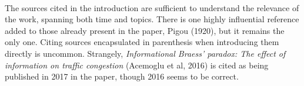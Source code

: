 \documentclass[../review.tex]{subfiles}
\begin{document}
\\
The sources cited in the introduction are sufficient to understand the relevance of the work, spanning both time and topics. There is one highly influential reference added to those already present in the paper, Pigou (1920), but it remains the only one. Citing sources encapsulated in parenthesis when introducing them directly is uncommon. Strangely, \textit{Informational Braess' paradox: The
effect of information on traffic congestion} (Acemoglu et al, 2016) is cited as being published in 2017 in the paper, though 2016 seems to be correct.
\end{document}
